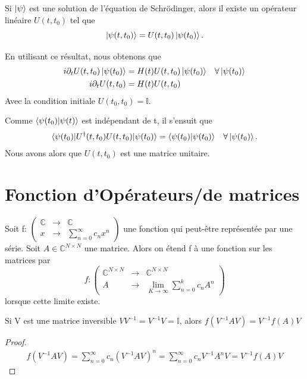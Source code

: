 \documentclass[../notesdecours.tex]{subfiles}
\begin{document}
\begin{Property} Si $\ket{\psi}$ est une solution de l'équation de Schrödinger, alors il existe un opérateur linéaire $U(t,t_0)$ tel que
\begin{equation}
\ket{\psi (t,t_0)} = U(t,t_0)\ket{\psi(t_0)}.
\end{equation} \label{1}\end{Property}

En utilisant ce résultat, nous obtenons que
\begin{align*}
i\partial_t U(t,t_0)\ket{\psi(t_0)} &= H(t)U(t,t_0)\ket{\psi(t_0)}		&\forall\ket{\psi(t_0)}\\
i\partial_t U(t,t_0) &= H(t)U(t,t_0)
\end{align*}
Avec la condition initiale $U(t_0,t_0) = \mathbb{I}$.\\

\begin{Property} Comme $\braket{\psi(t_0)|\psi(t)}$ est indépendant de t, il s'ensuit que 
\begin{align}
\braket{\psi(t_0)|U^\dag (t,t_0)U(t,t_0)|\psi(t_0)} &= \braket{\psi(t_0)|\psi(t_0)}		&\forall\ket{\psi(t_0)}.
\end{align}
Nous avons alors que $U(t,t_0)$ est une matrice unitaire. \end{Property}

\section{Fonction d'Opérateurs/de matrices}
Soit f: $\begin{pmatrix}
\mathbb{C} & \rightarrow & \mathbb{C}\\
x & \rightarrow & \sum_{n = 0}^{\infty} c_nx^n
\end{pmatrix}$ une fonction qui peut-être représentée par une série. Soit $A\in\mathbb{C}^{N\times N}$ une matrice. Alors on étend f à une fonction sur les matrices par
\begin{equation}
f: \begin{pmatrix}
\mathbb{C}^{N\times N} & \rightarrow & \mathbb{C}^{N\times N}\\
A & \rightarrow & \lim_{K\to\infty} \sum_{n = 0}^{k} c_n A^n
\end{pmatrix}
\end{equation}
lorsque cette limite existe.

\begin{Property} Si V est une matrice inversible $VV^{-1} = V^{-1}V = \mathbb{I}$, alors $f(V^{-1}AV) = V^{-1}f(A)V$ \end{Property}
\begin{proof}
\begin{align*}
f(V^{-1}AV) = \sum_{n = 0}^{\infty} c_n (V^{-1}AV)^n = \sum_{n = 0}^{\infty} c_n V^{-1} A^n V = V^{-1}f(A)V
\end{align*}
\end{proof}
\end{document}
